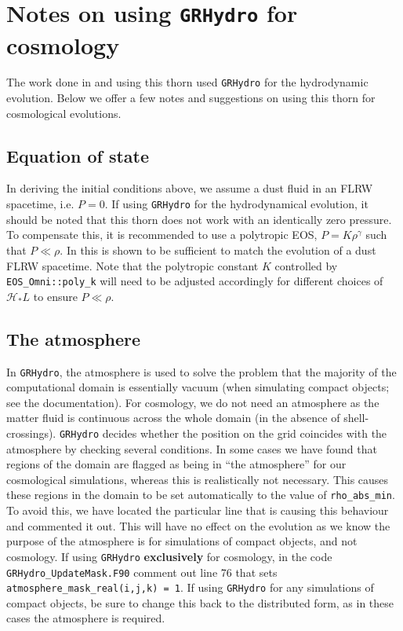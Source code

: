\section{Notes on using {\tt GRHydro} for cosmology}
\label{sec:note}

The work done in \cite{macpherson2017} and \cite{macpherson2019} using this thorn used {\tt GRHydro} for the hydrodynamic evolution. Below we offer a few notes and suggestions on using this thorn for cosmological evolutions. 

\subsection{Equation of state}

In deriving the initial conditions above, we assume a dust fluid in an FLRW spacetime, i.e. $P=0$. If using {\tt GRHydro} for the hydrodynamical evolution, it should be noted that this thorn does not work with an identically zero pressure. To compensate this, it is recommended to use a polytropic EOS, $P=K \rho^{\gamma}$ such that $P\ll\rho$. In \cite{macpherson2017} this is shown to be sufficient to match the evolution of a dust FLRW spacetime. Note that the polytropic constant $K$ controlled by \texttt{EOS\_Omni::poly\_k} will need to be adjusted accordingly for different choices of $\mathcal{H}_* L$ to ensure $P\ll\rho$.



\subsection{The atmosphere}

In {\tt GRHydro}, the atmosphere is used to solve the problem that the majority of the computational domain is essentially vacuum (when simulating compact objects; see the documentation). For cosmology, we do not need an atmosphere as the matter fluid is continuous across the whole domain (in the absence of shell-crossings). {\tt GRHydro} decides whether the position on the grid coincides with the atmosphere by checking several conditions. In some cases we have found that regions of the domain are flagged as being in ``the atmosphere'' for our cosmological simulations, whereas this is realistically not necessary. This causes these regions in the domain to be set automatically to the value of {\tt rho\_abs\_min}. To avoid this, we have located the particular line that is causing this behaviour and commented it out. This will have no effect on the evolution as we know the purpose of the atmosphere is for simulations of compact objects, and not cosmology. If using {\tt GRHydro} {\bf exclusively} for cosmology, in the code {\tt GRHydro\_UpdateMask.F90} comment out line 76 that sets {\tt atmosphere\_mask\_real(i,j,k) = 1}. If using {\tt GRHydro} for any simulations of compact objects, be sure to change this back to the distributed form, as in these cases the atmosphere is required. 





